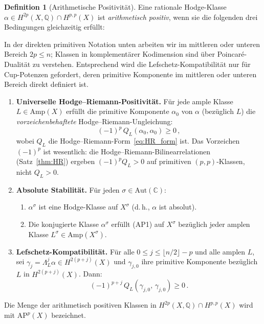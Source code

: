 \documentclass[aps,prd,twocolumn,superscriptaddress,nofootinbib]{revtex4-2}
\theoremstyle{definition}
\newtheorem{definition}[theorem]{Definition}
\theoremstyle{remark}
\begin{document}
\begin{definition}[Arithmetische Positivität]
\label{def:arith_pos}
Eine rationale Hodge-Klasse $\alpha \in H^{2p}(X, \mathbb{Q}) \cap H^{p,p}(X)$ ist \textit{arithmetisch positiv}, wenn sie die folgenden drei Bedingungen gleichzeitig erfüllt:

In der direkten primitiven Notation unten arbeiten wir im mittleren oder unteren Bereich $2p\leq n$; Klassen in komplementärer Kodimension sind über Poincaré-Dualität zu verstehen.  Entsprechend wird die Lefschetz-Kompatibilität nur für Cup-Potenzen gefordert, deren primitive Komponente im mittleren oder unteren Bereich direkt definiert ist.

\begin{enumerate}
\item[\textbf{(AP1)}] \textbf{Universelle Hodge--Riemann-Positivität.} Für jede ample Klasse $L \in \mathrm{Amp}(X)$ erfüllt die primitive Komponente $\alpha_0$ von $\alpha$ (bezüglich $L$) die \textit{vorzeichenbehaftete} Hodge--Riemann-Ungleichung:
\begin{equation}
(-1)^p\, Q_L(\alpha_0, \alpha_0) \geq 0\,,
\label{eq:AP1}
\end{equation}
wobei $Q_L$ die Hodge--Riemann-Form~\eqref{eq:HR_form} ist. Das Vorzeichen $(-1)^p$ ist wesentlich: die Hodge--Riemann-Bilinearrelationen (Satz~\ref{thm:HR}) ergeben $(-1)^p Q_L > 0$ auf primitiven $(p,p)$-Klassen, nicht $Q_L > 0$.

\item[\textbf{(AP2)}] \textbf{Absolute Stabilität.} Für jeden $\sigma \in \mathrm{Aut}(\mathbb{C})$:
\begin{enumerate}
\item[(a)] $\alpha^\sigma$ ist eine Hodge-Klasse auf $X^\sigma$ (d.\,h., $\alpha$ ist absolut).
\item[(b)] Die konjugierte Klasse $\alpha^\sigma$ erfüllt (AP1) auf $X^\sigma$ bezüglich jeder amplen Klasse $L^\sigma \in \mathrm{Amp}(X^\sigma)$.
\end{enumerate}

\item[\textbf{(AP3)}] \textbf{Lefschetz-Kompatibilität.} Für alle $0 \leq j \leq \lfloor n/2\rfloor - p$ und alle amplen $L$, sei $\gamma_j = \Lambda_L^j \alpha \in H^{2(p+j)}(X)$ und $\gamma_{j,0}$ ihre primitive Komponente bezüglich $L$ in $H^{2(p+j)}(X)$. Dann:
\begin{equation}
(-1)^{p+j}\, Q_{L}(\gamma_{j,0},\, \gamma_{j,0}) \geq 0\,.
\label{eq:AP3}
\end{equation}
\end{enumerate}

Die Menge der arithmetisch positiven Klassen in $H^{2p}(X, \mathbb{Q}) \cap H^{p,p}(X)$ wird mit $\mathrm{AP}^p(X)$ bezeichnet.
\end{definition}
\end{document}
